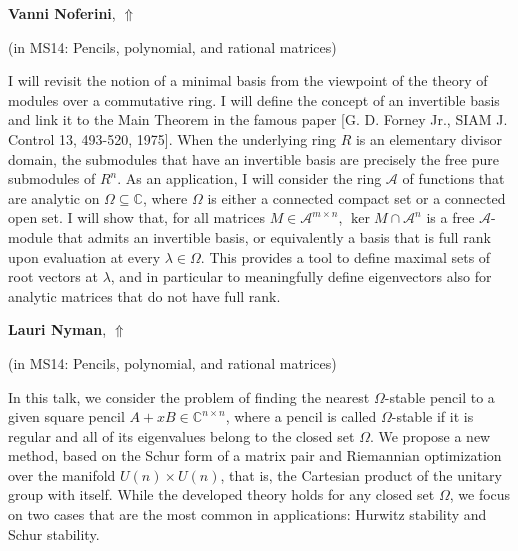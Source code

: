 \documentclass[ILAS2025-program.tex]{subfiles}
\begin{document}
     \hypertarget{down0213}{}\begin{ilasabstract}
    
    \textbf{Vanni Noferini},  \hfill \hyperlink{up0213}{$\Uparrow$}
    
    (in {\color{mstitle}MS14: Pencils, polynomial, and rational matrices})
        
        \mtskip
    I will revisit the notion of a minimal basis from the viewpoint of the theory of modules over a commutative ring. I will define the concept of an invertible basis and link it to the Main Theorem in the famous paper [G. D. Forney Jr., SIAM J. Control 13, 493-520, 1975]. When the underlying ring $R$ is an elementary divisor domain, the submodules that have an invertible basis are precisely the free pure submodules of $R^n$. As an application, I will consider the ring $\mathcal{A}$ of functions that are analytic on $\Omega \subseteq \mathbb{C}$, where $\Omega$ is either a connected compact set or a connected open set. I will show that, for all matrices $M \in \mathcal{A}^{m \times n}$, $\ker M \cap \mathcal{A}^n$ is a free $\mathcal{A}$-module that admits an invertible basis, or equivalently a basis that is full rank upon evaluation at every $\lambda \in \Omega$. This provides a tool to define maximal sets of root vectors at $\lambda$, and in particular to meaningfully define eigenvectors also for analytic matrices that do not have full rank.
\end{ilasabstract}
     \hypertarget{down0327}{}\begin{ilasabstract}
    
    \textbf{Lauri Nyman},  \hfill \hyperlink{up0327}{$\Uparrow$}
    
    (in {\color{mstitle}MS14: Pencils, polynomial, and rational matrices})
        
        \mtskip
    In this talk, we consider the problem of finding the nearest $\Omega$-stable pencil to a given square pencil $A+xB \in \mathbb{C}^{n \times n}$, where a pencil is called $\Omega$-stable if it is regular and all of its eigenvalues belong to the closed set $\Omega$. We propose a new method, based on the Schur form of a matrix pair and Riemannian optimization over the manifold $U(n) \times U(n)$, that is, the Cartesian product of the unitary group with itself. While the developed theory holds for any closed set $\Omega$, we focus on two cases that are the most common in applications: Hurwitz stability and Schur stability. 
\end{ilasabstract}
\end{document}
